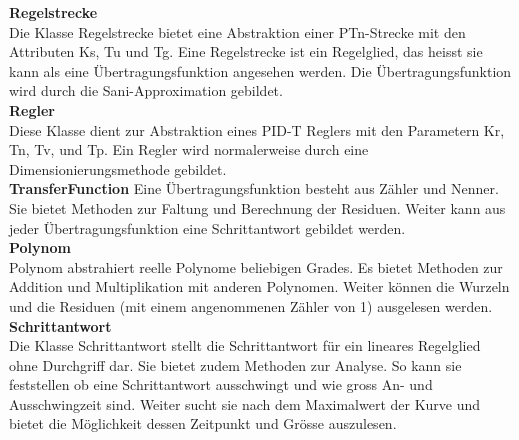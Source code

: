 \textbf{Regelstrecke}\\
Die Klasse Regelstrecke bietet eine Abstraktion einer PTn-Strecke mit den Attributen Ks, Tu und Tg. Eine Regelstrecke ist ein Regelglied, das heisst sie kann als eine Übertragungsfunktion angesehen werden. Die Übertragungsfunktion wird durch die Sani-Approximation gebildet.\\

\textbf{Regler}\\
Diese Klasse dient zur Abstraktion eines PID-T Reglers mit den Parametern Kr, Tn, Tv, und Tp. Ein Regler wird normalerweise durch eine Dimensionierungsmethode gebildet.\\

\textbf{TransferFunction}
Eine Übertragungsfunktion besteht aus Zähler und Nenner. Sie bietet Methoden zur Faltung und Berechnung der Residuen. Weiter kann aus jeder Übertragungsfunktion eine Schrittantwort gebildet werden.\\

\textbf{Polynom}\\
Polynom abstrahiert reelle Polynome beliebigen Grades. Es bietet Methoden zur Addition und Multiplikation mit anderen Polynomen. Weiter können die Wurzeln und die Residuen (mit einem angenommenen Zähler von 1) ausgelesen werden.\\
 
\textbf{Schrittantwort}\\
Die Klasse Schrittantwort stellt die Schrittantwort für ein lineares Regelglied ohne Durchgriff dar. Sie bietet zudem Methoden zur Analyse. So kann sie feststellen ob eine Schrittantwort ausschwingt und wie gross An- und Ausschwingzeit sind. Weiter sucht sie nach dem Maximalwert der Kurve und bietet die Möglichkeit dessen Zeitpunkt und Grösse auszulesen.

